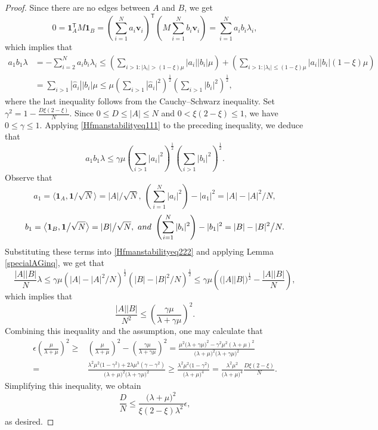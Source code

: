 \documentclass[10pt,a4paper]{amsart}
\numberwithin{equation}{section}
\def\v{\mathbf{v}}
\def\1{\mathbf{1}}
\begin{document}
\begin{proof}
Since there are no edges between $A$ and $B$, we get
$$0=\1_A^{\mathsf T}M\1_B=\left(\sum_{i=1}^N a_i\v_i\right)^{\!\mathsf T}
\left(M\sum_{i=1}^N b_i \v_i\right)
=\sum_{i=1}^N a_ib_i \lambda_i,$$
which implies that
\begin{align*}
a_1b_1\lambda & = -\sum_{i=2}^N a_ib_i \lambda_i
\leq \left(\sum_{ i>1: |\lambda_i|>(1-\xi) \mu  }  |a_i||b_i|\mu\right) +
\left(\sum_{ i>1: |\lambda_i|\leq(1-\xi) \mu  }  |a_i||b_i| (1-\xi) \mu\right) \\
&= \sum_{ i>1} |\widehat{a}_i||b_i|   \mu
\leq  \mu  \left(\sum_{ i>1} |\widehat{a}_i|^2\right)^{\frac{1}{2}}\left(\sum_{ i>1} |b_i|^2\right)^{\frac{1}{2}},
\end{align*}
where the last inequality follows from the Cauchy--Schwarz inequality.
Set $\gamma^2= 1-\frac{D \xi(2-\xi)}{N} $.
Since $0\leq D\leq |A|\leq N$ and $0<\xi(2-\xi)\leq1$,
we have $0\leq\gamma\leq1$.
Applying \eqref{Hfmanstabilityeq111} to the preceding inequality, we deduce that
\begin{equation}\label{Hfmanstabilityeq222}
a_1b_1\lambda
\leq   \gamma \mu  %
\left(\sum_{ i>1} |a_i|^2\right)^{\frac{1}{2}}\left(\sum_{ i>1} |b_i|^2\right)^{\frac{1}{2}} .
\end{equation}
Observe that
$$a_1=\big\langle \1_A,\1\big/\sqrt{N}\big\rangle=|A| \big/\sqrt{N},
~ \left(\sum_{ i=1}^N |a_i|^2\right)-|a_1|^2=|A|-|A|^2\big/ N,$$
$$b_1=\big\langle \1_B,\1\big/\sqrt{N}\big\rangle=|B| \big/\sqrt{N},
~{\rm and~} \left(\sum_{ i=1}^N |b_i|^2\right)-|b_1|^2=|B|-|B|^2\big/ N.$$
Substituting these terms into \eqref{Hfmanstabilityeq222} and applying Lemma \ref{specialAGinq}, we get that
\begin{equation}\label{Hfmanstabilityeq333}
\frac{|A||B|}{N} \lambda
\leq \gamma  \mu
\left(|A|-|A|^2 / N \right)^{\frac{1}{2}}
\left(|B|-|B|^2 / N \right)^{\frac{1}{2}}
\leq  \gamma \mu
\left( \big(|A||B|\big)^{\frac{1}{2}}- \frac{|A||B|}{N} \right),
\end{equation}
which implies that
$$
\frac{|A||B|}{N^2}
\leq \left(\frac{\gamma\mu }{\lambda  +\gamma \mu }\right)^2.
$$
Combining this inequality and the assumption,
one may calculate that
\begin{align*}
\epsilon \left(\frac{\mu }{\lambda  +\mu }\right)^2
\geq &\left(\frac{ \mu  }{\lambda  +  \mu }\right)^2
-\left(\frac{\gamma\mu }{\lambda  +\gamma \mu  }\right)^2
=\frac{ \mu^2 \big(\lambda  +  \gamma\mu \big)^2
- \gamma^2\mu^2 (\lambda  +  \mu)^2}
{\big(\lambda +  \mu  \big)^2\big(\lambda  +  \gamma\mu  \big)^2}
\\
=&\frac{\lambda^2\mu^2\big(1-\gamma ^2\big)+2\lambda\mu^3(\gamma-\gamma ^2)}
{\big(\lambda  +  \mu  \big)^2\big(\lambda  +  \gamma\mu  \big)^2}
\geq \frac{ \lambda^2\mu^2\big(1- \gamma ^2\big) }
{\big(\lambda  +  \mu  \big)^4}=\frac{ \lambda^2\mu^2 }
{\big(\lambda  +  \mu  \big)^4}\frac{D \xi(2-\xi)}{N}.
\end{align*}
Simplifying this inequality, we obtain
$$\frac{D }{N} \leq
\frac{\big(\lambda +  \mu  \big)^2 }{ \xi(2-\xi)\lambda ^2} \epsilon,$$
as desired.
\end{proof}
\end{document}
